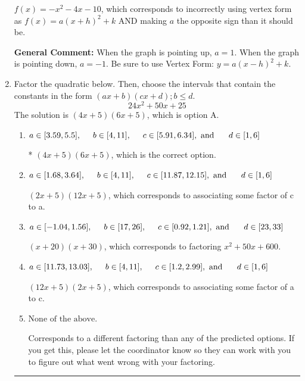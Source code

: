 \documentclass{extbook}[14pt]
\newcommand{\litem}[1]{\item #1

\rule{\textwidth}{0.4pt}}
\begin{document}
\begin{enumerate}
{\begin{enumerate}[label=\Alph*.]
$f(x)=-x^{2} -4 x -10$, which corresponds to incorrectly using vertex form as $f(x) = a(x+h)^2+k$ AND making $a$ the opposite sign than it should be.
\end{enumerate}

\textbf{General Comment:} When the graph is pointing up, $a=1$. When the graph is pointing down, $a=-1$. Be sure to use Vertex Form: $y = a(x-h)^2+k$.
}
\litem{
Factor the quadratic below. Then, choose the intervals that contain the constants in the form $(ax+b)(cx+d); b \leq d.$
\[ 24x^{2} +50 x + 25 \]The solution is \( (4x + 5)(6x + 5) \), which is option A.\begin{enumerate}[label=\Alph*.]
\item \( a \in [3.59, 5.5], \hspace*{5mm} b \in [4, 11], \hspace*{5mm} c \in [5.91, 6.34], \text{ and } \hspace*{5mm} d \in [1, 6] \)

* $(4x + 5)(6x + 5)$, which is the correct option.
\item \( a \in [1.68, 3.64], \hspace*{5mm} b \in [4, 11], \hspace*{5mm} c \in [11.87, 12.15], \text{ and } \hspace*{5mm} d \in [1, 6] \)

 $(2x + 5)(12x + 5)$, which corresponds to associating some factor of c to a.
\item \( a \in [-1.04, 1.56], \hspace*{5mm} b \in [17, 26], \hspace*{5mm} c \in [0.92, 1.21], \text{ and } \hspace*{5mm} d \in [23, 33] \)

 $(x + 20)(x + 30)$, which corresponds to factoring $x^{2} +50 x + 600$.
\item \( a \in [11.73, 13.03], \hspace*{5mm} b \in [4, 11], \hspace*{5mm} c \in [1.2, 2.99], \text{ and } \hspace*{5mm} d \in [1, 6] \)

 $(12x + 5)(2x + 5)$, which corresponds to associating some factor of a to c.
\item \( \text{None of the above.} \)

 Corresponds to a different factoring than any of the predicted options. If you get this, please let the coordinator know so they can work with you to figure out what went wrong with your factoring.
\end{enumerate}

}
\end{enumerate}
\end{document}
